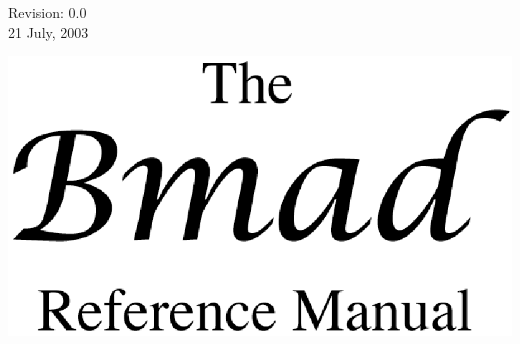 \thispagestyle{empty}

\begin{flushright}
\large
  Revision: 0.0 \\
  21 July, 2003
\end{flushright}

\vfill

{
\begin{center}
\includegraphics{bmad_title.ps} \\
\end{center}
}

\vskip 1in
\vfill
\break
